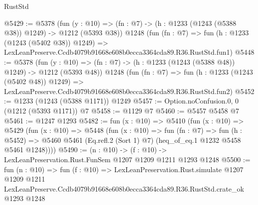 \begin{lexlean}{RustStd}
\begin{coremodule}
@5429 := @5378
    (fun (y : @10) => (fn : @7) -> (h : @1233 (@1243 (@5388 @38)) @1249) -> @1212 (@5393 @38))
    @1248
    (fun (fn : @7) =>
    fun (h : @1233 (@1243 (@5402 @38)) @1249) =>
    LexLeanPreserve.Ccdb4079b91668e608b0ecca3364cda89.R36.RustStd.fun1)
@5448 := @5378
    (fun (y : @10) => (fn : @7) -> (h : @1233 (@1243 (@5388 @48)) @1249) -> @1212 (@5393 @48))
    @1248
    (fun (fn : @7) =>
    fun (h : @1233 (@1243 (@5402 @48)) @1249) =>
    LexLeanPreserve.Ccdb4079b91668e608b0ecca3364cda89.R36.RustStd.fun2)
@5452 := @1233 (@1243 (@5388 @1171)) @1249
@5457 := Option.noConfusion.{0, 0} (@1212 (@5393 @1171)) @7
@5458 := @1129 @7
@5460 := @5457 @5458 @7
@5461 := @1247 @1293
@5482 := fun (x : @10) =>
  @5410
    (fun (x : @10) =>
    @5429
      (fun (x : @10) =>
      @5448
        (fun (x : @10) =>
        fun (fn : @7) =>
        fun (h : @5452) =>
        @5460 @5461 (Eq.refl.{2} (Sort 1) @7) (heq_of_eq.{1} @1232 @5458 @5461 @1248))))
@5490 := (n : @10) -> (f : @10) -> LexLeanPreservation.Rust.FunSem @1207 @1209 @1211 @1293 @1248
@5500 := fun (n : @10) =>
  fun (f : @10) =>
  LexLeanPreservation.Rust.simulate
    @1207
    @1209
    @1211
    LexLeanPreserve.Ccdb4079b91668e608b0ecca3364cda89.R36.RustStd.crate_ok
    @1293
    @1248
\end{coremodule}
\end{lexlean}
